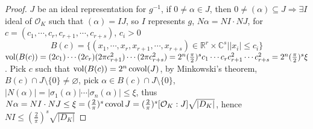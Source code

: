 \documentclass[../main.tex]{subfiles}
\begin{document}
\begin{proof}
$J$ be an ideal representation for $g^{-1}$, if $0\neq\alpha\in J$, then $0\neq(\alpha)\subseteq J\Rightarrow\exists I$ ideal of $\mathcal O_K$ such that $(\alpha)=IJ$, so $I$ represents $g$, $N\alpha=NI\cdot NJ$, for $c=(c_1,\cdots,c_r,c_{r+1},\cdots,c_{r+s})$, $c_i>0$
\[B(c)=\{(x_1,\cdots,x_r,x_{r+1},\cdots,x_{r+s})\in\mathbb R^r\times\mathbb C^s||x_i|\leq c_i\}\]
$\operatorname{vol}(B(c))=(2c_1)\cdots(2c_r)(2\pi c_{r+1}^2)\cdots(2\pi c_{r+s}^2)=2^n(\frac{\pi}{2})^sc_1\cdots c_rc_{r+1}^2\cdots c_{r+s}^2=2^n(\frac{\pi}{2})^s\xi$. Pick $c$ such that $\operatorname{vol}(B(c))=2^n\operatorname{covol}(J)$, by Minkowski's theorem, $B(c)\cap J\setminus\{0\}\neq\varnothing$, pick $\alpha\in B(c)\cap J\setminus\{0\}$, $|N(\alpha)|=|\sigma_1(\alpha)|\cdots|\sigma_n(\alpha)|\leq\xi$, thus $N\alpha=NI\cdot NJ\leq \xi=(\frac{2}{\pi})^s\operatorname{covol} J=(\frac{2}{\pi})^s[\mathcal O_K:J]\sqrt{|D_K|}$, hence $NI\leq(\frac{2}{\pi})^s\sqrt{|D_K|}$
\end{proof}
\end{document}
